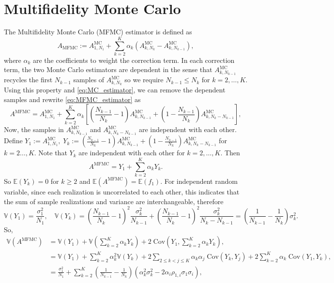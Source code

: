 \documentclass[final,3p,times,11pt]{elsarticle}
\begin{document}
\section{Multifidelity Monte Carlo}
The Multifidelity Monte Carlo (MFMC) estimator is defined as
\begin{equation}\label{eq:MFMC_estimator}
    A_{\text{MFMC}} := A^{\text{MC}}_{1,N_1} + \sum_{k=2}^K \alpha_k\left(A^{\text{MC}}_{k,N_k} - A^{\text{MC}}_{k,N_{k-1}} \right),
\end{equation}
where $\alpha_k$ are the coefficients to weight the correction term. In each correction term, the two Monte Carlo estimators are dependent in the sense that $A^{\text{MC}}_{k,N_{k-1}}$ recycles the first $N_{k-1}$ samples of $A^{\text{MC}}_{k,N_{k}}$ so we require $N_{k-1}\le N_k$ for $k=2,\ldots,K$. Using this property and \eqref{eq:MC_estimator}, we can remove the dependent samples and rewrite \eqref{eq:MFMC_estimator} as
\[
A^{\text{MFMC}} = A^{\text{MC}}_{1,N_1} +  \sum_{k=2}^K \alpha_k\left[\left(\frac{N_{k-1}}{N_{k}}-1\right)A_{k,N_{k-1}}^{\text{MC}}+\left(1-\frac{N_{k-1}}{N_{k}}\right) A_{k,N_k-N_{k-1}}^{\text{MC}}\right],
\]
Now, the samples in $A_{k,N_{k-1}}^{\text{MC}}$ and $A_{k,N_k-N_{k-1}}^{\text{MC}}$ are independent with each other. Define $Y_1 :=A^{\text{MC}}_{1,N_1},\; Y_k:=\left(\frac{N_{k-1}}{N_{k}}-1\right)A_{k,N_{k-1}}^{\text{MC}}+\left(1-\frac{N_{k-1}}{N_{k}}\right) A_{k,N_k-N_{k-1}}^{\text{MC}}$ for $k=2\ldots, K$.  Note that $Y_k$ are independent with each other for $k=2,\ldots, K$. Then 
\[
A^{\text{MFMC}} = Y_1 + \sum_{k=2}^K \alpha_k Y_k.
\]
So $\mathbb{E}(Y_k) = 0$ for $k\ge 2$ and $\mathbb{E}(A^{\text{MFMC}}) = \mathbb{E}(f_1) $. For independent random variable, since each realization is uncorrelated to each other, this indicates that the sum of sample realizations and variance are interchangeable, therefore
\[
\mathbb{V}\left(Y_1\right) = \frac{\sigma_1^2}{N_1}, \quad \mathbb{V}\left(Y_k\right) = \left(\frac{N_{k-1}}{N_{k}}-1\right)^2\frac{\sigma_k^2}{N_{k-1}}+\left(\frac{N_{k-1}}{N_{k}}-1\right)^2\frac{\sigma_k^2}{N_k-N_{k-1}} = \left(\frac{1}{N_{k-1}} - \frac{1}{N_k}\right)\sigma_k^2.
\]
So,
\begin{align}
    \nonumber
    \mathbb{V}\left(A^{\text{MFMC}}\right) &= \mathbb{V}\left(Y_1\right) + \mathbb{V}\left(\sum_{k=2}^K \alpha_kY_k\right)+2\;\text{Cov}\left(Y_1,\sum_{k=2}^K \alpha_k Y_k \right),\\
    \nonumber
    &=\mathbb{V}\left(Y_1\right) + \sum_{k=2}^K \alpha_k^2 \mathbb{V}\left(Y_k\right)+2\sum_{2\le k<j\le K} \alpha_k\alpha_j\; \text{Cov}(Y_k,Y_j) +2\sum_{k=2}^K \alpha_k\;\text{Cov}\left(Y_1, Y_k\right),\\
    &=\frac{\sigma_1^2}{N_1} + \sum_{k=2}^K \left(\frac{1}{N_{k-1}} - \frac{1}{N_k}\right)\left(\alpha_k^2\sigma_k^2 - 2\alpha_i\rho_{1,i}\sigma_1\sigma_i\right),
\end{align}
\end{document}
